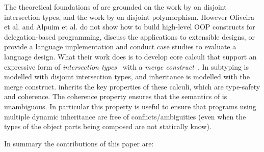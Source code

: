 The theoretical foundations of \name are grounded on the work by
\citet{oliveira2016disjoint} on disjoint intersection types, and the work by
\citet{alpuimdisjoint} on disjoint polymorphism. However Oliveira et al. and
Alpuim et al. do not show how to build high-level OOP constructs for
delegation-based programming, discuss the applications to extensible designs, or
provide a language implementation and conduct case studies to evaluate a
language design. What their work does is to develop core calculi that support an
expressive form of \emph{intersection
  types}~\cite{coppo1981functional,pottinger1980type} with a \emph{merge
  construct}~\cite{dunfield2014elaborating}. In \name subtyping is modelled with
disjoint intersection types, and inheritance is modelled with the merge
construct. \name inherits the key properties of these calculi, which are
type-safety and coherence. The coherence property ensures that the semantics of
\name is unambiguous. In particular this property is useful to ensure that
programs using multiple dynamic inheritance are free of conflicts/ambiguities
(even when the types of the object parts being composed are not statically
know).
  
\begin{comment}
The
novelty of the work in this paper is a three-fold. Firstly we show how
to develop and implement a statically typed, delegation-based OOP
source language on top of core language constructs provided by
disjoint intersection types. Secondly we illustrate the applications
of those high-level constructs to solve issues that show up in
extensibility designs. Finally, we provide a case study on
modularization of language components.
\end{comment}

In summary the contributions of this paper are:


